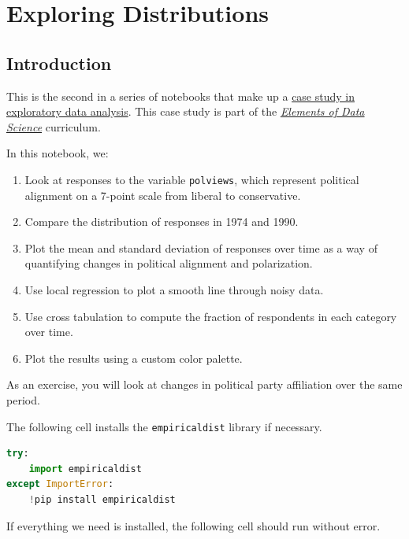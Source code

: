 \hypertarget{exploring-distributions}{%
\chapter{Exploring Distributions}\label{exploring-distributions}}

\hypertarget{introduction}{%
\section{Introduction}\label{introduction}}

This is the second in a series of notebooks that make up a
\href{https://allendowney.github.io/PoliticalAlignmentCaseStudy/}{case
study in exploratory data analysis}. This case study is part of the
\href{https://allendowney.github.io/ElementsOfDataScience/}{\emph{Elements
of Data Science}} curriculum.

In this notebook, we:

\begin{enumerate}
\def\labelenumi{\arabic{enumi}.}
\item
  Look at responses to the variable \passthrough{\lstinline!polviews!},
  which represent political alignment on a 7-point scale from liberal to
  conservative.
\item
  Compare the distribution of responses in 1974 and 1990.
\item
  Plot the mean and standard deviation of responses over time as a way
  of quantifying changes in political alignment and polarization.
\item
  Use local regression to plot a smooth line through noisy data.
\item
  Use cross tabulation to compute the fraction of respondents in each
  category over time.
\item
  Plot the results using a custom color palette.
\end{enumerate}

As an exercise, you will look at changes in political party affiliation
over the same period.

The following cell installs the \passthrough{\lstinline!empiricaldist!}
library if necessary.

\begin{lstlisting}[language=Python,style=source]
try:
    import empiricaldist
except ImportError:
    !pip install empiricaldist
\end{lstlisting}

If everything we need is installed, the following cell should run
without error.

